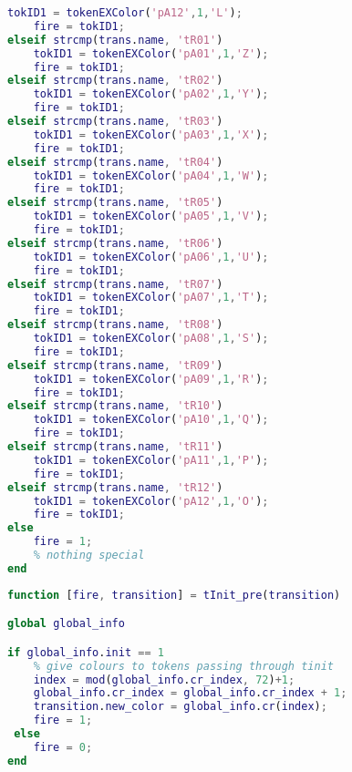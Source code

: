 \begin{lstlisting}[language=MATLAB, caption=COMMON\_PRE.m]
    tokID1 = tokenEXColor('pA12',1,'L');
    fire = tokID1;
elseif strcmp(trans.name, 'tR01')
    tokID1 = tokenEXColor('pA01',1,'Z');
    fire = tokID1;
elseif strcmp(trans.name, 'tR02')
    tokID1 = tokenEXColor('pA02',1,'Y');
    fire = tokID1;
elseif strcmp(trans.name, 'tR03')
    tokID1 = tokenEXColor('pA03',1,'X');
    fire = tokID1;
elseif strcmp(trans.name, 'tR04')
    tokID1 = tokenEXColor('pA04',1,'W');
    fire = tokID1;
elseif strcmp(trans.name, 'tR05')
    tokID1 = tokenEXColor('pA05',1,'V');
    fire = tokID1;
elseif strcmp(trans.name, 'tR06')
    tokID1 = tokenEXColor('pA06',1,'U');
    fire = tokID1;
elseif strcmp(trans.name, 'tR07')
    tokID1 = tokenEXColor('pA07',1,'T');
    fire = tokID1;
elseif strcmp(trans.name, 'tR08')
    tokID1 = tokenEXColor('pA08',1,'S');
    fire = tokID1;
elseif strcmp(trans.name, 'tR09')
    tokID1 = tokenEXColor('pA09',1,'R');
    fire = tokID1;
elseif strcmp(trans.name, 'tR10')
    tokID1 = tokenEXColor('pA10',1,'Q');
    fire = tokID1;
elseif strcmp(trans.name, 'tR11')
    tokID1 = tokenEXColor('pA11',1,'P');
    fire = tokID1;
elseif strcmp(trans.name, 'tR12')
    tokID1 = tokenEXColor('pA12',1,'O');
    fire = tokID1;
else
    fire = 1;
    % nothing special
end
\end{lstlisting}


\begin{lstlisting}[language=MATLAB, caption=tInit\_pre.m]
function [fire, transition] = tInit_pre(transition)

global global_info

if global_info.init == 1
    % give colours to tokens passing through tinit
    index = mod(global_info.cr_index, 72)+1;
    global_info.cr_index = global_info.cr_index + 1;
    transition.new_color = global_info.cr(index);
    fire = 1;
 else
    fire = 0;
end
\end{lstlisting}


